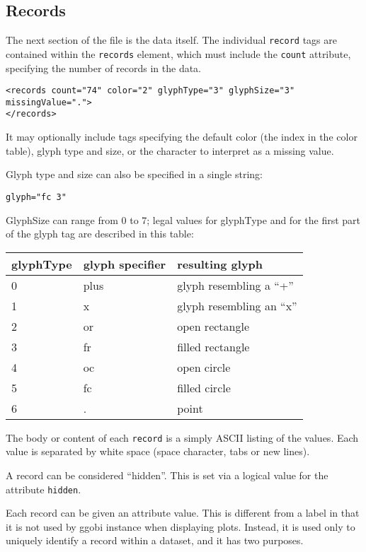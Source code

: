\documentclass{article}
\def\XMLAttribute#1{\Escape{#1}}
\begin{document}
\subsection{Records}

The next section of the file is the data itself.  The individual
\texttt{record} tags are contained within the \texttt{records}
element, which must include the \texttt{count} attribute, specifying
the number of records in the data.

\begin{verbatim}
<records count="74" color="2" glyphType="3" glyphSize="3" missingValue=".">
</records>
\end{verbatim}
%
It may optionally include tags specifying the default color (the
index in the color table), glyph type and size, or the character to
interpret as a missing value.

Glyph type and size can also be specified in a single string:
\begin{verbatim}
glyph="fc 3"
\end{verbatim}
GlyphSize can range from 0 to 7; legal values for glyphType and
for the first part of the glyph tag are described in this table:

\begin{tabular}{l|l|l}
glyphType & glyph specifier & resulting glyph \\
\hline
0 & plus & glyph resembling a ``+'' \\
1 & x    & glyph resembling an ``x'' \\
2 & or   & open rectangle \\
3 & fr   & filled rectangle \\
4 & oc   & open circle \\
5 & fc   & filled circle \\
6 & .    & point
\end{tabular}

The body or content of each \texttt{record} is a simply ASCII listing
of the values. Each value is separated by white space (space
character, tabs or new lines).

A record can be considered ``hidden''.  This is set via a logical
value for the attribute \texttt{hidden}.

Each record can be given an \XMLAttribute{id} attribute value.  This
is different from a label in that it is not used by ggobi instance
when displaying plots.  Instead, it is used only to uniquely identify
a record within a dataset, and it has two purposes.
\end{document}
